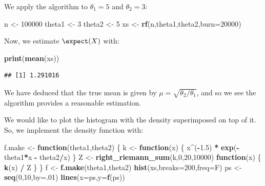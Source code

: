 \documentclass[
  11pt,
]{article}
\newenvironment{Shaded}{\begin{snugshade}}{\end{snugshade}}
\newcommand{\AttributeTok}[1]{\textcolor[rgb]{0.13,0.29,0.53}{#1}}
\newcommand{\ControlFlowTok}[1]{\textcolor[rgb]{0.13,0.29,0.53}{\textbf{#1}}}
\newcommand{\DecValTok}[1]{\textcolor[rgb]{0.00,0.00,0.81}{#1}}
\newcommand{\FloatTok}[1]{\textcolor[rgb]{0.00,0.00,0.81}{#1}}
\newcommand{\FunctionTok}[1]{\textcolor[rgb]{0.13,0.29,0.53}{\textbf{#1}}}
\newcommand{\NormalTok}[1]{#1}
\newcommand{\OtherTok}[1]{\textcolor[rgb]{0.56,0.35,0.01}{#1}}
\newcommand{\SpecialCharTok}[1]{\textcolor[rgb]{0.81,0.36,0.00}{\textbf{#1}}}
\begin{document}
We apply the algorithm to \(\theta_1 = 5\) and \(\theta_2 = 3\):

\begin{Shaded}
\begin{Highlighting}[]
\NormalTok{n }\OtherTok{\textless{}{-}} \DecValTok{100000}
\NormalTok{theta1 }\OtherTok{\textless{}{-}} \DecValTok{3}
\NormalTok{theta2 }\OtherTok{\textless{}{-}} \DecValTok{5}
\NormalTok{xs }\OtherTok{\textless{}{-}} \FunctionTok{rf}\NormalTok{(n,theta1,theta2,}\AttributeTok{burn=}\DecValTok{20000}\NormalTok{)}
\end{Highlighting}
\end{Shaded}

Now, we estimate \(\expect(X)\) with:

\begin{Shaded}
\begin{Highlighting}[]
\FunctionTok{print}\NormalTok{(}\FunctionTok{mean}\NormalTok{(xs))}
\end{Highlighting}
\end{Shaded}

\begin{verbatim}
## [1] 1.291016
\end{verbatim}

We have deduced that the true mean is given by
\(\mu = \sqrt{\theta_2/\theta_1}\), and so we see the algorithm provides
a reasonable estimation.

We would like to plot the histogram with the density superimposed on top
of it. So, we implement the density function with:

\begin{Shaded}
\begin{Highlighting}[]
\NormalTok{f.make }\OtherTok{\textless{}{-}} \ControlFlowTok{function}\NormalTok{(theta1,theta2)}
\NormalTok{\{}
\NormalTok{  k }\OtherTok{\textless{}{-}} \ControlFlowTok{function}\NormalTok{(x) \{ x}\SpecialCharTok{\^{}}\NormalTok{(}\SpecialCharTok{{-}}\FloatTok{1.5}\NormalTok{) }\SpecialCharTok{*} \FunctionTok{exp}\NormalTok{(}\SpecialCharTok{{-}}\NormalTok{theta1}\SpecialCharTok{*}\NormalTok{x }\SpecialCharTok{{-}}\NormalTok{ theta2}\SpecialCharTok{/}\NormalTok{x) \}}
\NormalTok{  Z }\OtherTok{\textless{}{-}} \FunctionTok{right\_riemann\_sum}\NormalTok{(k,}\DecValTok{0}\NormalTok{,}\DecValTok{20}\NormalTok{,}\DecValTok{10000}\NormalTok{)}
  \ControlFlowTok{function}\NormalTok{(x) \{ }\FunctionTok{k}\NormalTok{(x) }\SpecialCharTok{/}\NormalTok{ Z \}}
\NormalTok{\}}
\NormalTok{f }\OtherTok{\textless{}{-}} \FunctionTok{f.make}\NormalTok{(theta1,theta2)}
\FunctionTok{hist}\NormalTok{(xs,}\AttributeTok{breaks=}\DecValTok{200}\NormalTok{,}\AttributeTok{freq=}\NormalTok{F)}
\NormalTok{ps }\OtherTok{\textless{}{-}} \FunctionTok{seq}\NormalTok{(}\DecValTok{0}\NormalTok{,}\DecValTok{10}\NormalTok{,}\AttributeTok{by=}\NormalTok{.}\DecValTok{01}\NormalTok{)}
\FunctionTok{lines}\NormalTok{(}\AttributeTok{x=}\NormalTok{ps,}\AttributeTok{y=}\FunctionTok{f}\NormalTok{(ps))}
\end{Highlighting}
\end{Shaded}
\end{document}
